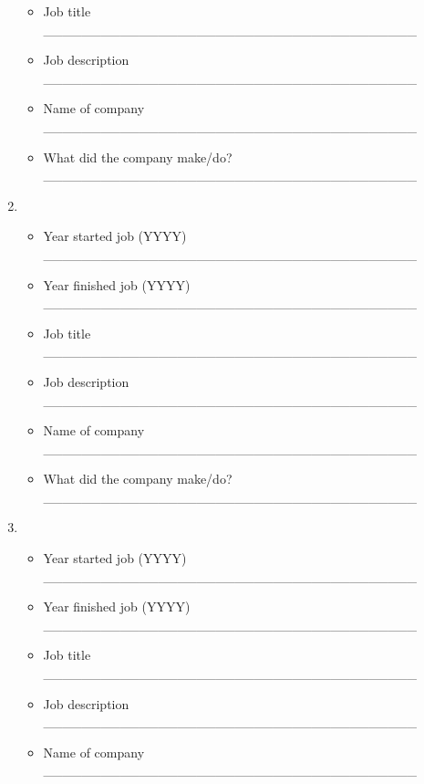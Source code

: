 \documentclass[a4paper,10pt]{article}
\begin{document}
\begin{enumerate}
\begin{itemize}
         \item Job title \_\_\_\_\_\_\_\_\_\_\_\_\_\_\_\_\_\_\_\_\_\_\_\_\_\_\_\_\_\_\_\_\_\_\_\_\_\_\_
         \item Job description \_\_\_\_\_\_\_\_\_\_\_\_\_\_\_\_\_\_\_\_\_\_\_\_\_\_\_\_\_\_\_\_\_\_\_\_\_\_\_
         \item Name of company \_\_\_\_\_\_\_\_\_\_\_\_\_\_\_\_\_\_\_\_\_\_\_\_\_\_\_\_\_\_\_\_\_\_\_\_\_\_\_
         \item What did the company make/do? \_\_\_\_\_\_\_\_\_\_\_\_\_\_\_\_\_\_\_\_\_\_\_\_\_\_\_\_\_\_\_\_\_\_\_\_\_\_\_
      \end{itemize}
 \item
     \begin{itemize}
         \item Year started job (YYYY) \_\_\_\_\_\_\_\_\_\_\_\_\_\_\_\_\_\_\_\_\_\_\_\_\_\_\_\_\_\_\_\_\_\_\_\_\_\_\_ 
         \item Year finished job (YYYY) \_\_\_\_\_\_\_\_\_\_\_\_\_\_\_\_\_\_\_\_\_\_\_\_\_\_\_\_\_\_\_\_\_\_\_\_\_\_\_
         \item Job title \_\_\_\_\_\_\_\_\_\_\_\_\_\_\_\_\_\_\_\_\_\_\_\_\_\_\_\_\_\_\_\_\_\_\_\_\_\_\_
         \item Job description \_\_\_\_\_\_\_\_\_\_\_\_\_\_\_\_\_\_\_\_\_\_\_\_\_\_\_\_\_\_\_\_\_\_\_\_\_\_\_
         \item Name of company \_\_\_\_\_\_\_\_\_\_\_\_\_\_\_\_\_\_\_\_\_\_\_\_\_\_\_\_\_\_\_\_\_\_\_\_\_\_\_
         \item What did the company make/do? \_\_\_\_\_\_\_\_\_\_\_\_\_\_\_\_\_\_\_\_\_\_\_\_\_\_\_\_\_\_\_\_\_\_\_\_\_\_\_
      \end{itemize}
 \item
     \begin{itemize}
         \item Year started job (YYYY) \_\_\_\_\_\_\_\_\_\_\_\_\_\_\_\_\_\_\_\_\_\_\_\_\_\_\_\_\_\_\_\_\_\_\_\_\_\_\_ 
         \item Year finished job (YYYY) \_\_\_\_\_\_\_\_\_\_\_\_\_\_\_\_\_\_\_\_\_\_\_\_\_\_\_\_\_\_\_\_\_\_\_\_\_\_\_
         \item Job title \_\_\_\_\_\_\_\_\_\_\_\_\_\_\_\_\_\_\_\_\_\_\_\_\_\_\_\_\_\_\_\_\_\_\_\_\_\_\_
         \item Job description \_\_\_\_\_\_\_\_\_\_\_\_\_\_\_\_\_\_\_\_\_\_\_\_\_\_\_\_\_\_\_\_\_\_\_\_\_\_\_
         \item Name of company \_\_\_\_\_\_\_\_\_\_\_\_\_\_\_\_\_\_\_\_\_\_\_\_\_\_\_\_\_\_\_\_\_\_\_\_\_\_\_

\end{itemize}
\end{enumerate}
\end{document}
